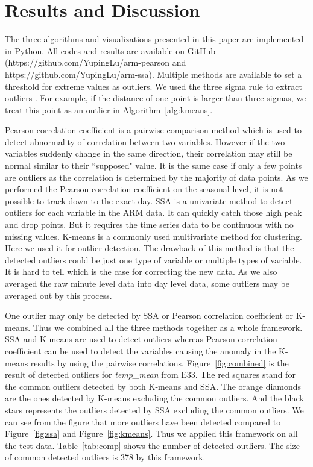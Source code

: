 \section{Results and Discussion}
The three algorithms and visualizations presented in this paper are 
implemented in Python. All codes and results are available on GitHub 
(https://github.com/YupingLu/arm-pearson and https://github.com/YupingLu/arm-ssa). 
Multiple methods are available to set a threshold for extreme values as 
outliers. We used the three sigma rule to extract outliers \cite{pukelsheim1994three}. 
For example, if the distance of one point is larger than three sigmas, 
we treat this point as an outlier in Algorithm~\ref{alg:kmeans}.

Pearson correlation coefficient is a pairwise comparison method which 
is used to detect abnormality of correlation between two variables. 
However if the two variables suddenly change in the same direction, 
their correlation may still be normal similar to their ``supposed" 
value. It is the same case if only a few points are outliers as the
correlation is determined by the majority of data points. 
As we performed the Pearson correlation 
coefficient on the seasonal level, it is not possible to track down 
to the exact day. SSA is a univariate method to detect outliers for 
each variable in the ARM data. It can quickly catch those high peak 
and drop points. But it requires the time series data to be continuous 
with no missing values. K-means is a commonly used multivariate method 
for clustering. Here we used it for outlier detection. The drawback of this method is 
that the detected outliers could be just one type of variable or 
multiple types of variable. It is hard to tell which is the case for 
correcting the new data. As we also averaged the raw 
minute level data into day level data, some outliers may be averaged 
out by this process.

One outlier may only be detected by SSA or Pearson correlation coefficient 
or K-means. Thus we combined all the three methods together as a 
whole framework. SSA and K-means are used to detect outliers whereas Pearson 
correlation coefficient can be used to detect the variables causing the anomaly 
in the K-means results by using the pairwise correlations. Figure~\ref{fig:combined} is the result of 
detected outliers for \textit{temp\_mean} from E33. The red squares 
stand for the common outliers detected by both K-means and SSA. The 
orange diamonds are the ones detected by K-means excluding the common 
outliers. And the black stars represents the outliers detected by SSA 
excluding the common outliers. We can see from the figure that more 
outliers have been detected compared to Figure~\ref{fig:ssa} and Figure~\ref{fig:kmeans}. 
Thus we applied this framework on all the test data. Table~\ref{tab:comp} 
shows the number of detected outliers. The size of common detected 
outliers is 378 by this framework.

